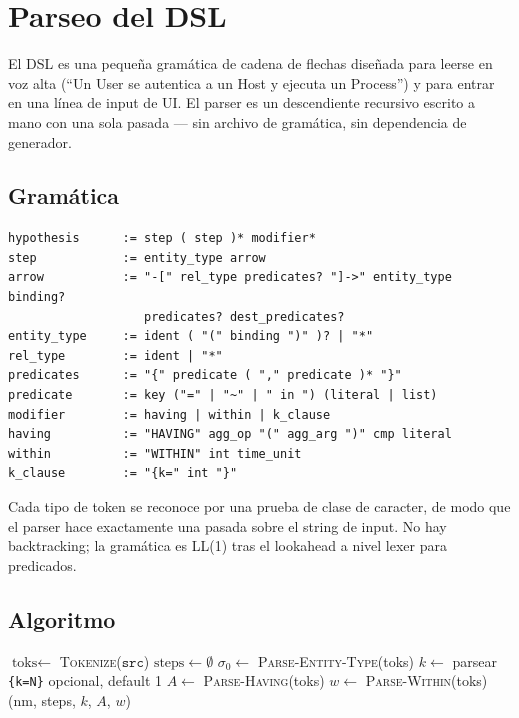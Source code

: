 \chapter{Parseo del DSL}
\label{ch:dsl}

El DSL es una pequeña gramática de cadena de flechas diseñada para
leerse en voz alta (``Un User se autentica a un Host y ejecuta un
Process'') y para entrar en una línea de input de UI. El parser
es un descendiente recursivo escrito a mano con una sola pasada
--- sin archivo de gramática, sin dependencia de generador.

\section{Gramática}

\begin{verbatim}
hypothesis      := step ( step )* modifier*
step            := entity_type arrow
arrow           := "-[" rel_type predicates? "]->" entity_type binding?
                   predicates? dest_predicates?
entity_type     := ident ( "(" binding ")" )? | "*"
rel_type        := ident | "*"
predicates      := "{" predicate ( "," predicate )* "}"
predicate       := key ("=" | "~" | " in ") (literal | list)
modifier        := having | within | k_clause
having          := "HAVING" agg_op "(" agg_arg ")" cmp literal
within          := "WITHIN" int time_unit
k_clause        := "{k=" int "}"
\end{verbatim}

Cada tipo de token se reconoce por una prueba de clase de
caracter, de modo que el parser hace exactamente una pasada
sobre el string de input. No hay backtracking; la gramática es
LL(1) tras el lookahead a nivel lexer para predicados.

\section{Algoritmo}

\begin{algorithm}
\caption{\textsc{Parse-Dsl}}\label{alg:parse-dsl}
$\text{toks} \gets $ \textsc{Tokenize}($\texttt{src}$) 
$\text{steps} \gets \emptyset$\;
$\sigma_0 \gets $ \textsc{Parse-Entity-Type}(toks)\;
$k \gets$ parsear \texttt{\{k=N\}} opcional, default 1\;
$A \gets$ \textsc{Parse-Having}(toks)\;
$w \gets$ \textsc{Parse-Within}(toks)\;
\Return {}(nm, steps, $k$, $A$, $w$)\;
\end{algorithm}

